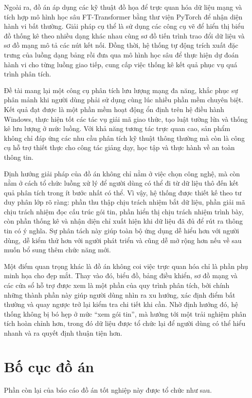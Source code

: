 \documentclass[../DoAn.tex]{subfiles}
\begin{document}
Ngoài ra, đồ án áp dụng các kỹ thuật đồ họa để trực quan hóa dữ liệu mạng và tích hợp mô hình học sâu FT-Transformer bằng thư viện PyTorch để nhận diện hành vi bất thường. Giải pháp cụ thể là sử dụng các công cụ vẽ để hiển thị biểu đồ thống kê theo nhiều dạng khác nhau cùng sơ đồ tiến trình trao đổi dữ liệu và sơ đồ mạng mô tả các nút kết nối. Đồng thời, hệ thống tự động trích xuất đặc trưng của luồng dạng bảng rồi đưa qua mô hình học sâu để thực hiện dự đoán hành vi cho từng luồng giao tiếp, cung cấp việc thống kê kết quả phục vụ quá trình phân tích.

Đề tài mang lại một công cụ phân tích lưu lượng mạng đa năng, khắc phục sự phân mảnh khi người dùng phải sử dụng cùng lúc nhiều phần mềm chuyên biệt. Kết quả đạt được là một phần mềm hoạt động ổn định trên hệ điều hành Windows, thực hiện tốt các tác vụ giải mã giao thức, tạo luật tường lửa và thống kê lưu lượng ở mức luồng. Với khả năng tương tác trực quan cao, sản phẩm không chỉ đáp ứng các nhu cầu phân tích kỹ thuật thông thường mà còn là công cụ hỗ trợ thiết thực cho công tác giảng dạy, học tập và thực hành về an toàn thông tin.

Định hướng giải pháp của đồ án không chỉ nằm ở việc chọn công nghệ, mà còn nằm ở cách tổ chức luồng xử lý để người dùng có thể đi từ dữ liệu thô đến kết quả phân tích trong ít bước nhất có thể. Vì vậy, hệ thống được thiết kế theo tư duy phân lớp rõ ràng: phần thu thập chịu trách nhiệm bắt dữ liệu, phần giải mã chịu trách nhiệm đọc cấu trúc gói tin, phần hiển thị chịu trách nhiệm trình bày, còn phần thống kê và nhận diện chỉ xuất hiện khi dữ liệu đã đủ để rút ra thông tin có ý nghĩa. Sự phân tách này giúp toàn bộ ứng dụng dễ hiểu hơn với người dùng, dễ kiểm thử hơn với người phát triển và cũng dễ mở rộng hơn nếu về sau muốn bổ sung thêm chức năng mới.

Một điểm quan trọng khác là đồ án không coi việc trực quan hóa chỉ là phần phụ minh họa cho đẹp mắt. Thay vào đó, biểu đồ, bảng điều khiển, sơ đồ mạng và các cửa sổ hỗ trợ được xem là một phần của quy trình phân tích, bởi chính những thành phần này giúp người dùng nhìn ra xu hướng, xác định điểm bất thường và quay ngược trở lại kiểm tra chi tiết khi cần. Nhờ định hướng đó, hệ thống không bị bó hẹp ở mức “xem gói tin”, mà hướng tới một trải nghiệm phân tích hoàn chỉnh hơn, trong đó dữ liệu được tổ chức lại để người dùng có thể hiểu nhanh và ra quyết định thuận tiện hơn.

\section{Bố cục đồ án}
Phần còn lại của báo cáo đồ án tốt nghiệp này được tổ chức như sau.
\end{document}
